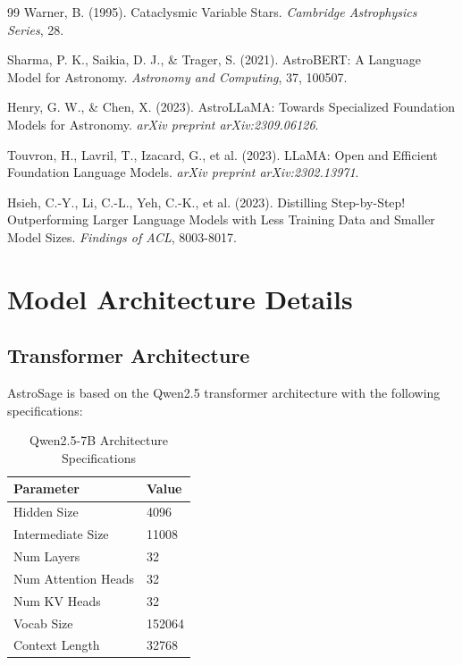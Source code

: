 \documentclass[11pt,a4paper]{article}
\begin{document}
\begin{thebibliography}{99}
Warner, B. (1995).
Cataclysmic Variable Stars.
\textit{Cambridge Astrophysics Series}, 28.

Sharma, P. K., Saikia, D. J., \& Trager, S. (2021).
AstroBERT: A Language Model for Astronomy.
\textit{Astronomy and Computing}, 37, 100507.

Henry, G. W., \& Chen, X. (2023).
AstroLLaMA: Towards Specialized Foundation Models for Astronomy.
\textit{arXiv preprint arXiv:2309.06126}.

Touvron, H., Lavril, T., Izacard, G., et al. (2023).
LLaMA: Open and Efficient Foundation Language Models.
\textit{arXiv preprint arXiv:2302.13971}.

Hsieh, C.-Y., Li, C.-L., Yeh, C.-K., et al. (2023).
Distilling Step-by-Step! Outperforming Larger Language Models with Less Training Data and Smaller Model Sizes.
\textit{Findings of ACL}, 8003-8017.

\end{thebibliography}

\newpage
\appendix

\section{Model Architecture Details}\label{app:architecture}

\subsection{Transformer Architecture}

AstroSage is based on the Qwen2.5 transformer architecture with the following specifications:

\begin{table}[htbp]
\centering
\caption{Qwen2.5-7B Architecture Specifications}
\begin{tabular}{ll}
\toprule
\textbf{Parameter} & \textbf{Value} \\
\midrule
Hidden Size & 4096 \\
Intermediate Size & 11008 \\
Num Layers & 32 \\
Num Attention Heads & 32 \\
Num KV Heads & 32 \\
Vocab Size & 152064 \\
Context Length & 32768 \\
\bottomrule
\end{tabular}
\end{table}
\end{document}
